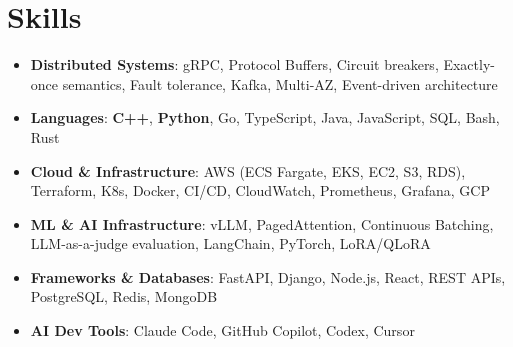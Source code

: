 \documentclass[letterpaper,11pt]{article}
\newcommand{\resumeSubHeadingListStart}{\begin{itemize}[leftmargin=0.15in, label={}]}
\newcommand{\resumeSubHeadingListEnd}{\end{itemize}}
\newcommand{\resumeSkillHeading}[2]{%
  \item\small{\textbf{#1}: #2 \vspace{-9pt}}%
}
\begin{document}
\section{Skills}
  \resumeSubHeadingListStart
    \resumeSkillHeading{Distributed Systems}{gRPC, Protocol Buffers, Circuit breakers, Exactly-once semantics, Fault tolerance, Kafka, Multi-AZ, Event-driven architecture}
    \resumeSkillHeading{Languages}{\textbf{C++}, \textbf{Python}, Go, TypeScript, Java, JavaScript, SQL, Bash, Rust}
    \resumeSkillHeading{Cloud \& Infrastructure}{AWS (ECS Fargate, EKS, EC2, S3, RDS), Terraform, K8s, Docker, CI/CD, CloudWatch, Prometheus, Grafana, GCP}
    \resumeSkillHeading{ML \& AI Infrastructure}{vLLM, PagedAttention, Continuous Batching, LLM-as-a-judge evaluation, LangChain, PyTorch, LoRA/QLoRA}
    \resumeSkillHeading{Frameworks \& Databases}{FastAPI, Django, Node.js, React, REST APIs, PostgreSQL, Redis, MongoDB}
    \resumeSkillHeading{AI Dev Tools}{Claude Code, GitHub Copilot, Codex, Cursor}
  \resumeSubHeadingListEnd
\end{document}
